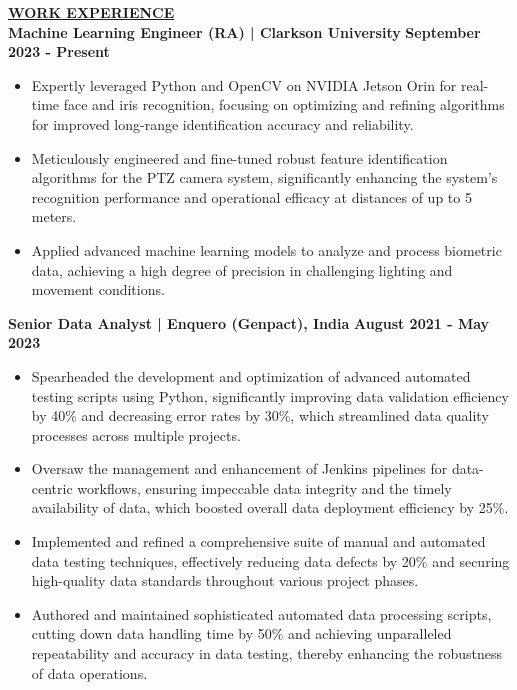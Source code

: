 \documentclass{article}
\begin{document}
\noindent \textbf{\underline{WORK EXPERIENCE}}\\
\noindent \textbf{Machine Learning Engineer (RA) | Clarkson University} \hfill \textbf{September 2023 - Present}
\begin{itemize}[noitemsep,nolistsep,leftmargin=*]
\item {\small Expertly leveraged Python and OpenCV on NVIDIA Jetson Orin for real-time face and iris recognition, focusing on optimizing and refining algorithms for improved long-range identification accuracy and reliability.}
\item {\small Meticulously engineered and fine-tuned robust feature identification algorithms for the PTZ camera system, significantly enhancing the system's recognition performance and operational efficacy at distances of up to 5 meters.}
\item {\small Applied advanced machine learning models to analyze and process biometric data, achieving a high degree of precision in challenging lighting and movement conditions.}
\end{itemize}
\vspace{1mm} 
\noindent \textbf{Senior Data Analyst | Enquero (Genpact), India} \hfill \textbf{August 2021 - May 2023}
\begin{itemize}[noitemsep,nolistsep,leftmargin=*]
\item {\small Spearheaded the development and optimization of advanced automated testing scripts using Python, significantly improving data validation efficiency by 40\% and decreasing error rates by 30\%, which streamlined data quality processes across multiple projects.}
\item {\small Oversaw the management and enhancement of Jenkins pipelines for data-centric workflows, ensuring impeccable data integrity and the timely availability of data, which boosted overall data deployment efficiency by 25\%.}
\item {\small Implemented and refined a comprehensive suite of manual and automated data testing techniques, effectively reducing data defects by 20\% and securing high-quality data standards throughout various project phases.}
\item {\small Authored and maintained sophisticated automated data processing scripts, cutting down data handling time by 50\% and achieving unparalleled repeatability and accuracy in data testing, thereby enhancing the robustness of data operations.}
\end{itemize}
\vspace{1mm} 
\end{document}
